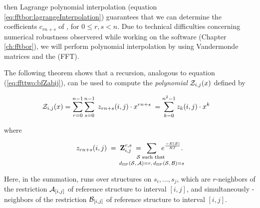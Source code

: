 then Lagrange polynomial interpolation
(equation \ref{eq:fftbor:lagrangeInterpolation})
guarantees that we can determine the coefficients $c_{rn+s}$ of \emZ{},
for $0 \leq r,s < n$. Due to technical difficulties concerning numerical
robustness observered while working on the \fftbor software
(Chapter \ref{ch:fftbor}), we will perform polynomial interpolation
by using Vandermonde matrices and the \fft (FFT).

The following theorem shows that a
recursion, analogous to equation (\ref{eq:ffttwo:bfZabij}),
can be used to compute
the {\em polynomial} ${\mathcal Z}_{i,j}(x)$ defined by

\begin{align}
\label{eq:ffttwo:emZij}
\emZ{i,j} &= \sum_{r=0}^{n-1} \sum_{s=0}^{n-1}\;
z_{rn+s}(i,j) \cdot x^{rn+s}\; =
\sum_{k=0}^{n^2-1} z_{k}(i,j) \cdot x^{k}
\end{align}

where

\begin{align}
z_{rn+s}(i,j) \;=\; \bfZ{r,s}{i,j}\;=
\enspace\sum_{\mathclap{\substack{
\str \text{ such that } \rule[-.5ex]{0pt}{0pt} \\
\dBP{\str}{\strA} = r,\,\dBP{\str}{\strB} = s
}}}\enspace
\boltzF{\str}.
\end{align}

Here, in the summation, \str runs over structures on $s_i,\dots,s_j$, which
are $r$-neighbors of the restriction $\mathcal A_{[i,j]}$ of reference structure
\strA to interval $[i,j]$, and simultaneously
\str-neighbors of the restriction $\mathcal B_{[i,j]}$ of reference structure
\strB to interval $[i,j]$.

